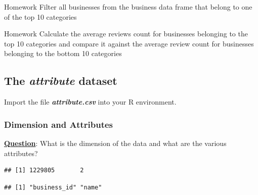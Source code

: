 \begin{DIY}{Homework}
\noindent Filter all businesses from the business data frame that belong to one of the top 10 categories
\end{DIY}

\begin{DIY}{Homework}
\noindent Calculate the average reviews count for businesses belonging to the top 10 categories and compare it against the average review count for businesses belonging to the bottom 10 categories
\end{DIY}

\subsection{The \textbf{\emph{attribute}} dataset}
\noindent Import the file \emph{\textbf{attribute.csv}} into your R environment.  


\subsubsection{Dimension and Attributes}
\noindent \textbf{\underline{Question}}: What is the dimension of the data and what are the various attributes?
\begin{knitrout}
\color{fgcolor}\begin{kframe}
\begin{alltt}
\end{alltt}
\begin{verbatim}
## [1] 1229805       2
\end{verbatim}
\begin{alltt}
\end{alltt}
\begin{verbatim}
## [1] "business_id" "name"
\end{verbatim}
\begin{alltt}
\end{alltt}
\end{kframe}
\end{knitrout}

